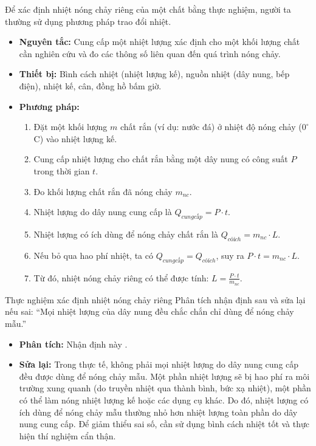 \begin{kienthuc}
Để xác định nhiệt nóng chảy riêng của một chất bằng thực nghiệm, người ta thường sử dụng phương pháp trao đổi nhiệt.
\begin{itemize}
    \item \textbf{Nguyên tắc:} Cung cấp một nhiệt lượng xác định cho một khối lượng chất cần nghiên cứu và đo các thông số liên quan đến quá trình nóng chảy.
    \item \textbf{Thiết bị:} Bình cách nhiệt (nhiệt lượng kế), nguồn nhiệt (dây nung, bếp điện), nhiệt kế, cân, đồng hồ bấm giờ.
    \item \textbf{Phương pháp:}
    \begin{enumerate}
        \item Đặt một khối lượng $m$ chất rắn (ví dụ: nước đá) ở nhiệt độ nóng chảy ($0^\circ$C) vào nhiệt lượng kế.
        \item Cung cấp nhiệt lượng cho chất rắn bằng một dây nung có công suất $P$ trong thời gian $t$.
        \item Đo khối lượng chất rắn đã nóng chảy $m_{nc}$.
        \item Nhiệt lượng do dây nung cung cấp là $Q_{cung cấp} = P \cdot t$.
        \item Nhiệt lượng có ích dùng để nóng chảy chất rắn là $Q_{có ích} = m_{nc} \cdot L$.
        \item Nếu bỏ qua hao phí nhiệt, ta có $Q_{cung cấp} = Q_{có ích}$, suy ra $P \cdot t = m_{nc} \cdot L$.
        \item Từ đó, nhiệt nóng chảy riêng có thể được tính: $L = \frac{P \cdot t}{m_{nc}}$.
    \end{enumerate}
\end{itemize}
\end{kienthuc}

\begin{hoatdong}{Thực nghiệm xác định nhiệt nóng chảy riêng}
Phân tích nhận định sau và sửa lại nếu sai: “Mọi nhiệt lượng của dây nung đều chắc chắn chỉ dùng để nóng chảy mẫu.”
\begin{itemize}
    \item \textbf{Phân tích:} Nhận định này .
    \item \textbf{Sửa lại:} Trong thực tế, không phải mọi nhiệt lượng do dây nung cung cấp đều được dùng để nóng chảy mẫu. Một phần nhiệt lượng sẽ bị hao phí ra môi trường xung quanh (do truyền nhiệt qua thành bình, bức xạ nhiệt), một phần có thể làm nóng nhiệt lượng kế hoặc các dụng cụ khác. Do đó, nhiệt lượng có ích dùng để nóng chảy mẫu thường nhỏ hơn nhiệt lượng toàn phần do dây nung cung cấp. Để giảm thiểu sai số, cần sử dụng bình cách nhiệt tốt và thực hiện thí nghiệm cẩn thận.
\end{itemize}
\end{hoatdong}


